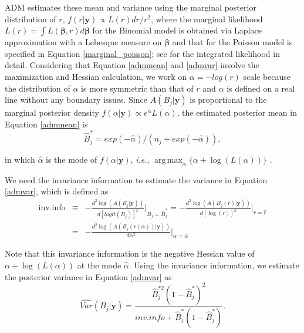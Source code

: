 \documentclass[article]{jss}
\DeclareMathOperator*{\argmax}{arg\,max}
\begin{document}
ADM estimates these mean and variance using the marginal posterior distribution of $r$, $f(r\vert\boldsymbol{y})\propto L(r)dr/r^2$, where the marginal likelihood $L(r)=\int L(\boldsymbol{\beta}, r)d\boldsymbol{\beta}$ for the Binomial model is obtained via Laplace approximation with a Lebesque measure on $\boldsymbol{\beta}$ and that for the Poisson model is specified in Equation \ref{marginal_poisson}; see \cite{berger1999integrated} for the integrated likelihood in detail. Considering that Equation \ref{admmean} and  \ref{admvar} involve the maximization and Hessian calculation, we work on $\alpha=-log(r)$ scale because the distribution of $\alpha$ is more symmetric than that of $r$ and $\alpha$ is defined on a real line without any boundary issues. Since $A(B_j\vert\boldsymbol{y})$ is proportional to the marginal posterior density $f(\alpha\vert\boldsymbol{y})\propto e^\alpha L(\alpha)$, the estimated posterior mean in Equation \ref{admmean} is 
\begin{equation}\label{meaninvariance}
\hat{B}^\ast_j=exp(-\hat{\alpha})/(n_j+exp(-\hat{\alpha})),
\end{equation}


in which $\hat{\alpha}$ is the mode of $f(\alpha\vert\boldsymbol{y})$, \emph{i.e.}, $\argmax_{\alpha}\{\alpha+\log(L(\alpha))\}$ .

We need the invariance information \citep{tang2011} to estimate the variance in Equation \ref{admvar}, which is defined as 
\begin{eqnarray}
\textrm{inv.info} &\equiv& -\frac{d^2 \log(A(B_j\vert \boldsymbol{y}))}{d[logit(B_j)]^2}\bigg\vert_{B_j=\hat{B}^\ast_j}=-\frac{d^2 \log(A(B_j(r)\vert \boldsymbol{y}))}{d[\log(r)]^2}\bigg\vert_{r=\hat{r}}\label{invariance}\\
&=& -\frac{d^2 \log(A(B_j(r(\alpha))\vert \boldsymbol{y}))}{d\alpha^2}\bigg\vert_{\alpha=\hat{\alpha}}\nonumber
\end{eqnarray}

Note that this invariance information is  the negative Hessian value of $\alpha+\log(L(\alpha))$ at the mode $\hat{\alpha}$. Using the invariance information, we  estimate the posterior variance in Equation \ref{admvar} as
\begin{equation}\label{varianceinvariance}
\widehat{Var}(B_j\vert\boldsymbol{y})=\frac{\hat{B}^{\ast2}_j(1-\hat{B}^\ast_j)^2}{inv.info +\hat{B}^\ast_j(1-\hat{B}^\ast_j)}.
\end{equation}
\end{document}

